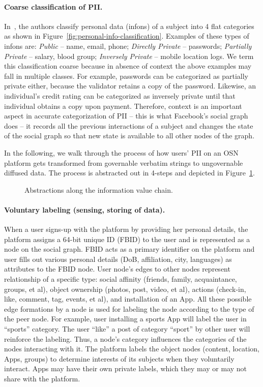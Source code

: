 \documentclass[a4paper,twoside]{article}
\begin{document}
\paragraph{Coarse classification of PII.}
In~\cite{inverse-privacy}, the authors classify personal data (infons)
of a subject into 4 flat categories as shown in
Figure~\ref{fig:personal-info-classification}. Examples of these types
of infons are: \textit{Public} -- name, email, phone; \textit{Directly
  Private} -- passwords; \textit{Partially Private} -- salary, blood
group; \textit{Inversely Private} -- mobile location logs. We term
this classification coarse because in absence of context the above
examples may fall in multiple classes. For example, passwords can be
categorized as partially private either, because the validator retains
a copy of the password. Likewise, an individual's credit rating can be
categorized as inversely private until that individual obtains a copy
upon payment. Therefore, context is an important aspect in accurate
categorization of PII -- this is what Facebook's social graph does --
it records all the previous interactions of a subject and changes the
state of the social graph so that new state is available to all other
nodes of the graph.

In the following, we walk through the process of how users' PII on an
OSN platform gets transformed from governable verbatim strings to
ungovernable diffused data. The process is abstracted out in 4-steps
and depicted in Figure~\ref{fig:data-life-cycle}.
%
\begin{figure}[!h]
  \centering
  {}
  \caption{Abstractions along the information value chain.}
  \label{fig:data-life-cycle}
\end{figure}
%
\paragraph{Voluntary labeling (sensing, storing of data).} When a user
signs-up with the platform by providing her personal details, the
platform assigns a 64-bit unique ID (FBID) to the user and is
represented as a node on the social graph. FBID acts as a primary
identifier on the platform and user fills out various personal details
(DoB, affiliation, city, languages) as attributes to the FBID
node. User node's edges to other nodes represent relationship of a
specific type: social affinity (friends, family, acquaintance, groups,
et al), object ownership (photos, post, video, et al), actions
(check-in, like, comment, tag, events, et al), and installation of an
App. All these possible edge formations by a node is used for labeling
the node according to the type of the peer node. For example, user
installing a sports App will label the user in ``sports''
category. The user ``like'' a post of category ``sport'' by other user
will reinforce the labeling. Thus, a node's category influences the
categories of the nodes interacting with it. The platform labels the
object nodes (content, location, Apps, groups) to determine interests
of its subjects when they voluntarily interact. Apps may have their
own private labels, which they may or may not share with the platform.
\end{document}
